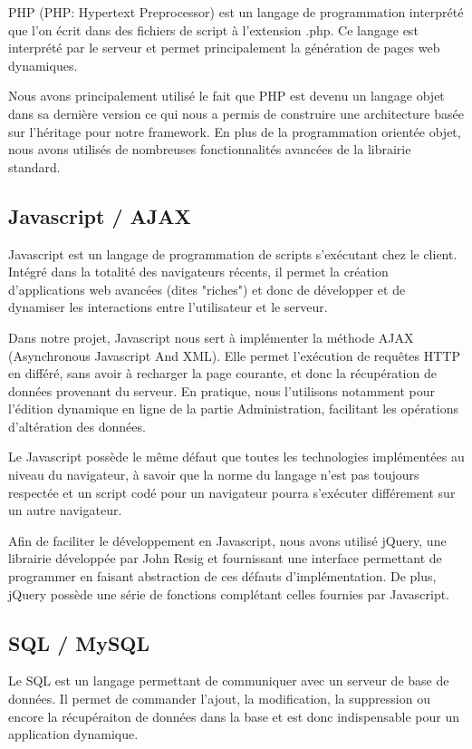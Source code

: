 PHP \cite{php} (PHP: Hypertext Preprocessor) est un langage de programmation interprété que l'on écrit
dans des fichiers de script à l'extension .php. Ce langage est interprété par le serveur
et permet principalement la génération de pages web dynamiques.

Nous avons principalement utilisé le fait que PHP est devenu un langage objet dans sa dernière version
ce qui nous a permis de construire une architecture basée sur l'héritage pour notre framework.
En plus de la programmation orientée objet, nous avons utilisés de nombreuses fonctionnalités avancées
de la librairie standard.

        \subsection{Javascript / AJAX}

Javascript est un langage de programmation de scripts s'exécutant chez le client.
Intégré dans la totalité des navigateurs récents, il permet la création d'applications web avancées (dites "riches") et donc 
de développer et de dynamiser les interactions entre l'utilisateur et le serveur.

Dans notre projet, Javascript nous sert à implémenter la méthode AJAX (Asynchronous Javascript And XML).
Elle permet l'exécution de requêtes HTTP en différé, sans avoir à recharger la page courante, et donc la récupération de données provenant du serveur.
En pratique, nous l'utilisons notamment pour l'édition dynamique en ligne de la partie Administration, facilitant les opérations d'altération des données.

Le Javascript possède le même défaut que toutes les technologies implémentées au niveau du navigateur,
à savoir que la norme du langage n'est pas toujours respectée et un script codé pour un navigateur pourra s'exécuter différement sur un autre navigateur.

Afin de faciliter le développement en Javascript, nous avons utilisé jQuery, une librairie développée par John Resig et fournissant
une interface permettant de programmer en faisant abstraction de ces défauts d'implémentation. De plus, jQuery possède
une série de fonctions complétant celles fournies par Javascript.

        \subsection{SQL / MySQL}

Le SQL est un langage permettant de communiquer avec un serveur de base de données. Il permet de commander l'ajout, 
la modification, la suppression ou encore la récupéraiton de données dans la base et est donc indispensable pour un application dynamique.

